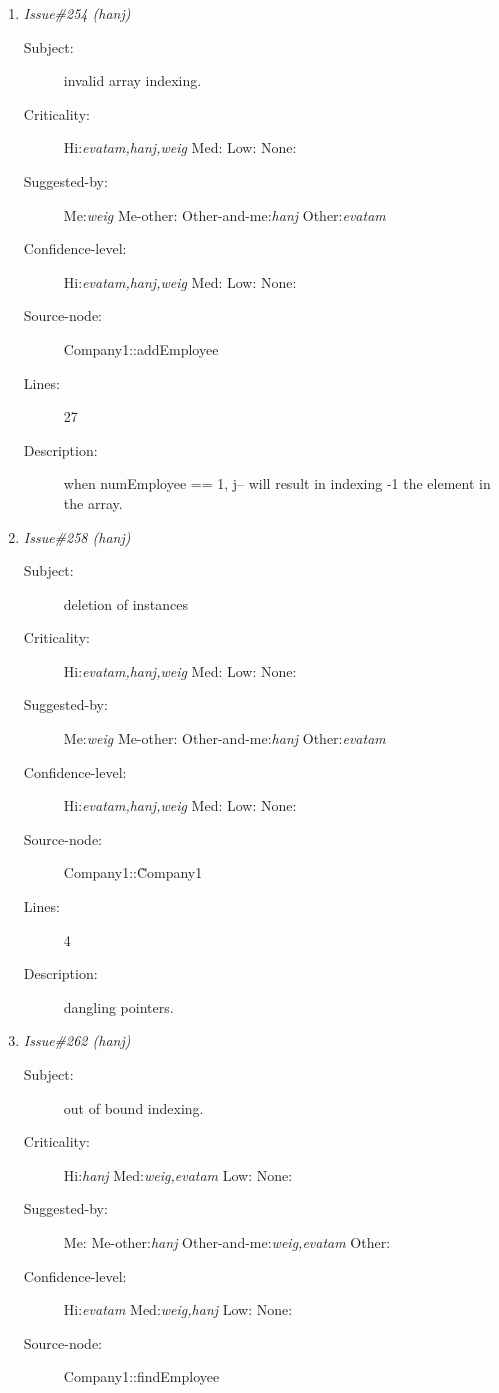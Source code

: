 \begin{enumerate}
\begin{description}
\item [Lines:] 6

\item [Description:] Workers[0] has never been initialized.
\end{description}
\item {\it Issue\#254 (hanj)}
\begin{description}
\item [Subject:] invalid array indexing.
\item [Criticality:] Hi:{\it evatam,hanj,weig} Med:{\it } Low:{\it } None:{\it }
\item [Suggested-by:] Me:{\it weig} Me-other:{\it } Other-and-me:{\it hanj} Other:{\it evatam}
\item [Confidence-level:] Hi:{\it evatam,hanj,weig} Med:{\it } Low:{\it } None:{\it }
\item [Source-node:] Company1::addEmployee

\item [Lines:] 27

\item [Description:] when numEmployee == 1, j-- will result in
indexing -1 the element in the array.
\end{description}
\item {\it Issue\#258 (hanj)}
\begin{description}
\item [Subject:] deletion of instances
\item [Criticality:] Hi:{\it evatam,hanj,weig} Med:{\it } Low:{\it } None:{\it }
\item [Suggested-by:] Me:{\it weig} Me-other:{\it } Other-and-me:{\it hanj} Other:{\it evatam}
\item [Confidence-level:] Hi:{\it evatam,hanj,weig} Med:{\it } Low:{\it } None:{\it }
\item [Source-node:] Company1::\~Company1

\item [Lines:] 4

\item [Description:] dangling pointers.
\end{description}
\item {\it Issue\#262 (hanj)}
\begin{description}
\item [Subject:] out of bound indexing.
\item [Criticality:] Hi:{\it hanj} Med:{\it weig,evatam} Low:{\it } None:{\it }
\item [Suggested-by:] Me:{\it } Me-other:{\it hanj} Other-and-me:{\it weig,evatam} Other:{\it }
\item [Confidence-level:] Hi:{\it evatam} Med:{\it weig,hanj} Low:{\it } None:{\it }
\item [Source-node:] Company1::findEmployee


\end{description}
\end{enumerate}
